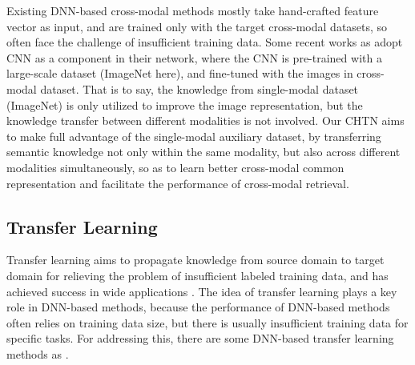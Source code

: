 \documentclass{article}
\begin{document}
Existing DNN-based cross-modal methods mostly take hand-crafted feature vector as input, and are trained only with the target cross-modal datasets, so often face the challenge of insufficient training data. Some recent works as \cite{DBLP:journals/tcyb/WeiZLWLZY17} adopt CNN as a component in their network, where the CNN is pre-trained with a large-scale dataset (ImageNet here), and fine-tuned with the images in cross-modal dataset. That is to say, the knowledge from single-modal dataset (ImageNet) is only utilized to improve the image representation, but the knowledge transfer between different modalities is not involved. %
Our CHTN aims to make full advantage of the single-modal auxiliary dataset, by transferring semantic knowledge not only within the same modality, but also across different modalities simultaneously, so as to learn better cross-modal common representation and facilitate the performance of cross-modal retrieval.


\subsection{Transfer Learning}
Transfer learning \cite{DBLP:journals/tkde/PanY10} aims to propagate knowledge from source domain to target domain for relieving the problem of insufficient labeled training data, and has achieved success in wide applications \cite{DBLP:conf/ijcai/SamdaniY11,DBLP:conf/ijcai/ChenZ13}.
The idea of transfer learning plays a key role in DNN-based methods, because the performance of DNN-based methods often relies on training data size, but there is usually insufficient training data for specific tasks. For addressing this, there are some DNN-based transfer learning methods as \cite{DBLP:conf/icml/GlorotBB11,DBLP:conf/icml/LongC0J15}.
\end{document}
